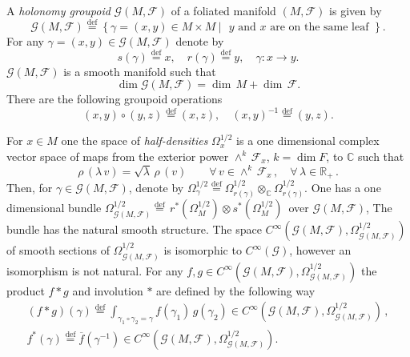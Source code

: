 \documentclass{beamer}
\theoremstyle{plain}
\newcommand{\be}{\begin{equation}}
\newcommand{\ee}{\end{equation}}
\newcommand{\C}{\mathbb{C}}
\newcommand{\G}{\mathcal{G}}
\newcommand{\sF}{\mathcal{F}}       %
\newcommand{\la}{\lambda}
\newcommand{\bydef}{\stackrel{\mathrm{def}}{=}}
\begin{document}
\begin{frame}
A \textit{holonomy groupoid} $\G\left(M, \sF\right)$ of a foliated manifold $\left(M, \sF\right)$ is given by
$$
\mathcal G\left(M, \sF\right)\bydef \left\{\left.\gamma = (x, y)\in M\times M~ \right|\text{ $y$ and $x$ are on the same leaf } \right\}.
$$
For any  $\gamma = (x, y)\in \mathcal G\left(M, \sF\right)$ denote by
$$
s\left(\gamma\right)\bydef x, \quad  r\left(\gamma\right)\bydef y, \quad \gamma: x \to y.
$$
$\mathcal G\left(M, \sF\right)$ is a smooth manifold such that
$$
\dim \mathcal G\left(M, \sF\right) = \dim \,M + \dim \,\mathcal F.
$$
 There are the following groupoid operations
$$
\left(x, y \right) \circ \left(y, z \right) \bydef \left(x, z \right), \quad \left(x, y \right)^{-1} \bydef \left(y, z\right). 
$$

\end{frame}
\begin{frame}
For
$x\in M$ one the space of \textit{half-densities} $\Omega_x^{1/2}$ is a one dimensional complex
vector space of maps from the exterior power $\wedge^k \,  \mathcal{F}_x$, $k =
\dim F$, to ${\mathbb C}$ such that
$$
\rho \, (\lambda \, v) =\sqrt{\la}\, \rho \, (v)
\qquad \forall \, v \in \wedge^k \,  \mathcal{F}_x \, , \quad \forall \,
\lambda \in {\mathbb R}_+ \, .
$$
Then, for $\gamma \in\mathcal G\left(M, \sF\right)$, denote by $\Omega_{\gamma}^{1/2}\bydef\Omega_{r\left(\gamma\right)}^{1/2} \otimes_\C
\Omega_{r\left(\gamma\right)}^{1/2}$. One has a one dimensional bundle $
\Omega_{\mathcal G\left(M, \sF\right)}^{1/2}\bydef\, r^*(\Omega_M^{1/2})\otimes s^*(\Omega_M^{1/2})\,
$ over $\mathcal G\left(M, \sF\right)$, The bundle has the natural smooth structure. The  space  $C^{\infty}\left(\mathcal G\left(M, \sF\right) , \Omega^{1/2}_{\mathcal G\left(M, \sF\right)}\right)$ of smooth sections of $
\Omega_{\mathcal G\left(M, \sF\right)}^{1/2}$ is isomorphic to  $C^\infty(\mathcal G)$, however an isomorphism is not natural.
For any $f, g \in C^{\infty}\left(\mathcal G\left(M, \sF\right) , \Omega^{1/2}_{\mathcal G\left(M, \sF\right)}\right)$  the
product $f* g$ and involution $*$ are defined by the following way
\be\nonumber
\begin{split}
(f * g) (\gamma) \bydef \int_{\gamma_1 \circ \gamma_2 = \gamma}
f(\gamma_1) \, g(\gamma_2)\in C^{\infty}\left(\mathcal G\left(M, \sF\right) , \Omega^{1/2}_{\mathcal G\left(M, \sF\right)}\right)  \,,\\
f^*\left(\gamma \right) \bydef \overline f \left( \gamma^{-1}\right) \in C^{\infty}\left(\mathcal G\left(M, \sF\right) , \Omega^{1/2}_{\mathcal G\left(M, \sF\right)}\right).
\end{split}
\ee
\end{frame}
\end{document}
